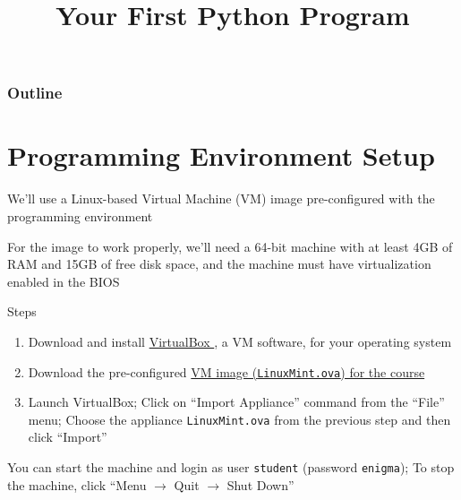\documentclass[8pt,a4paper,compress]{beamer}
\title{Your First Python Program}
\date{}
\begin{document}
\begin{frame}
\vfill
\titlepage
\end{frame}

\begin{frame}
\frametitle{Outline}
\tableofcontents
\end{frame}

\section{Programming Environment Setup}
\begin{frame}[fragile]
We'll use a Linux-based Virtual Machine (VM) image pre-configured with the programming environment

\bigskip

For the image to work properly, we'll need a 64-bit machine with at least 4GB of RAM and 15GB of free disk space, and the machine must have virtualization enabled in the BIOS
 
\bigskip

Steps
\begin{enumerate}
\item Download and install \href{https://www.virtualbox.org/wiki/Downloads}{VirtualBox \ExternalLink}, a VM software, for your operating system
\item Download the pre-configured \href{http://www.swamiiyer.net/teaching/LinuxMint.ova}{VM image (\lstinline$LinuxMint.ova$) for the course \ExternalLink}
\item Launch VirtualBox; Click on ``Import Appliance'' command from the ``File'' menu; Choose the appliance \lstinline{LinuxMint.ova} from the previous step and then click ``Import''
\end{enumerate}

\bigskip

You can start the machine and login as user \lstinline{student} (password \lstinline{enigma}); To stop the machine, click ``Menu $\to$ Quit $\to$ Shut Down''
\end{frame}
\end{document}
